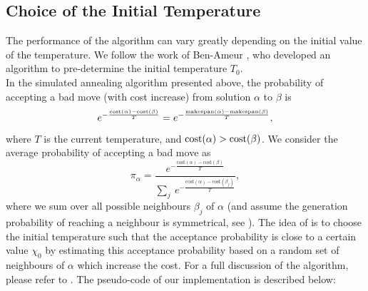 \documentclass[12pt,a4paper,reqno]{article}
\begin{document}
\subsection{Choice of the Initial Temperature}
\label{subsec:initTemp}
The performance of the algorithm can vary greatly depending on the initial value of the temperature. We follow the work of Ben-Ameur \citep{ameur2004}, who developed an algorithm to pre-determine the initial temperature $T_0$. \\

In the simulated annealing algorithm presented above, the probability of accepting a bad move (with cost increase) from solution $\alpha$ to $\beta$ is
\begin{equation}
e^{-\frac{\textnormal{cost}(\alpha)-\textnormal{cost}(\beta)}{T}} = e^{-\frac{\textnormal{makespan}(\alpha)-\text{makespan}(\beta)}{T}},
\end{equation}
where $T$ is the current temperature, and $\textnormal{cost}(\alpha) > \textnormal{cost}(\beta)$.
We consider the average probability of accepting a bad move as
\begin{equation}
\pi_\alpha = \frac{e^{-\frac{\text{cost}(\alpha)-\text{cost}(\beta)}{T}}}{\sum_j  \> e^{-\frac{\text{cost}(\alpha)-\text{cost}(\beta_j)}{T}}},
\end{equation}
where we sum over all possible neighbours $\beta_j$ of $\alpha$ (and assume the generation probability of reaching a neighbour is symmetrical, see \citet{ameur2004}). The idea of \citet{ameur2004} is to choose the initial temperature such that the acceptance probability is close to a certain value $\chi_0$ by estimating this acceptance probability based on a random set of neighbours of $\alpha$ which increase the cost. For a full discussion of the algorithm, please refer to \citet{ameur2004}. The pseudo-code of our implementation is described below: \\
\end{document}
